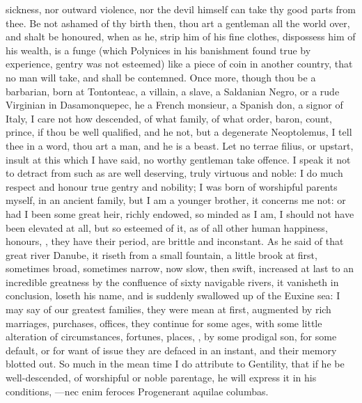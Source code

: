 {sickness, nor outward violence, nor the devil himself can take thy good
parts from thee. Be not ashamed of thy birth then, thou art a gentleman
all the world over, and shalt be honoured, when as he, strip him of his
fine clothes, dispossess him of his wealth, is a funge (which
 Polynices in his banishment found true by experience, gentry was
not esteemed) like a piece of coin in another country, that no man will
take, and shall be contemned. Once more, though thou be a barbarian,
born at Tontonteac, a villain, a slave, a Saldanian Negro, or a rude
Virginian in Dasamonquepec, he a French monsieur, a Spanish don, a
signor of Italy, I care not how descended, of what family, of what
order, baron, count, prince, if thou be well qualified, and he not, but
a degenerate Neoptolemus, I tell thee in a word, thou art a man, and he
is a beast.
Let no terrae filius, or upstart, insult at this which I have said, no
worthy gentleman take offence. I speak it not to detract from such as
are well deserving, truly virtuous and noble: I do much respect and
honour true gentry and nobility; I was born of worshipful parents
myself, in an ancient family, but I am a younger brother, it concerns
me not: or had I been some great heir, richly endowed, so minded as I
am, I should not have been elevated at all, but so esteemed of it, as
of all other human happiness, honours, \etc{}, they have their period, are
brittle and inconstant. As  he said of that great river Danube,
it riseth from a small fountain, a little brook at first, sometimes
broad, sometimes narrow, now slow, then swift, increased at last to an
incredible greatness by the confluence of sixty navigable rivers, it
vanisheth in conclusion, loseth his name, and is suddenly swallowed up
of the Euxine sea: I may say of our greatest families, they were mean
at first, augmented by rich marriages, purchases, offices, they
continue for some ages, with some little alteration of circumstances,
fortunes, places, \etc{}, by some prodigal son, for some default, or for
want of issue they are defaced in an instant, and their memory blotted
out.
So much in the mean time I do attribute to Gentility, that if he be
well-descended, of worshipful or noble parentage, he will express it in
his conditions,
---nec enim feroces
Progenerant aquilae columbas.

}
